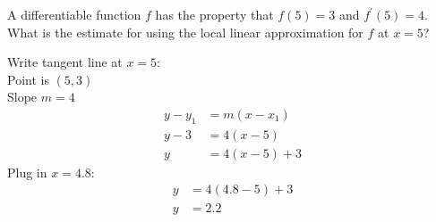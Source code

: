 \documentclass[12pt,letterpaper, onecolumn]{exam}
\begin{document}
\begin{questions}
\pagebreak

\question
A differentiable function $f$ has the property that $f(5)=3$ and $f^\prime(5)=4$. What is the estimate for 
using the local linear approximation for $f$ at $x = 5$?

\begin{solution}
	Write tangent line at $x=5$: \\
	Point is $(5,3)$ \\
	Slope $m=4$ \\
	\begin{align}
		y-y_{1} &= m(x-x_1) \\
		y-3 &= 4(x-5) \\
		y &= 4(x-5) + 3
	\end{align}
	Plug in $x=4.8$:
	\begin{align}
		y &= 4(4.8-5) + 3 \\
		y &= \boxed{2.2}
	\end{align}
\end{solution}

\end{questions}
\end{document}
